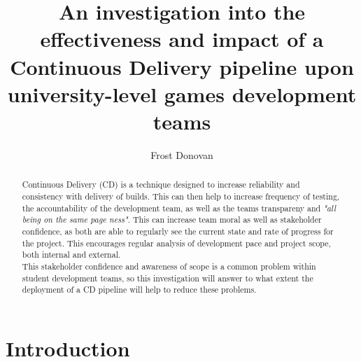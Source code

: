 \documentclass[lettersize,journal]{IEEEtran}
\begin{document}
\title{An investigation into the effectiveness and impact of a Continuous Delivery pipeline upon university-level games development teams}

\author{Frost Donovan}

\maketitle

\begin{abstract}

    Continuous Delivery (CD) is a technique designed to increase reliability and consistency with delivery of builds. This can then help to increase frequency of testing, the accountability of the development team, as well as the teams transpareny and \textit{"all being on the same page ness"}. This can increase team moral as well as stakeholder confidence, as both are able to regularly see the current state and rate of progress for the project. This encourages regular analysis of development pace and project scope, both internal and external. \\
    This stakeholder confidence and awareness of scope is a common problem within student development teams, so this investigation will answer to what extent the deployment of a CD pipeline will help to reduce these problems.
\end{abstract}

\section{Introduction}
\end{document}
